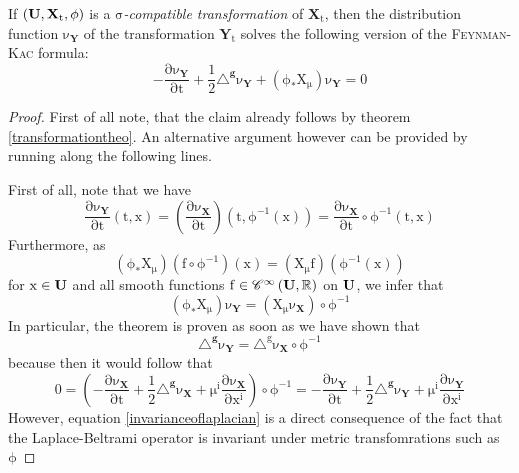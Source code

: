 \documentclass[10 pt,english]{smfart}
\newcommand{\Xt}{\mathrm{\mathbf{X}}_{t}}
\newcommand{\X}{\mathrm{\mathbf{X}}}
\newcommand{\Yt}{\mathrm{\mathbf{Y}}_{t}}
\newcommand{\Y}{\mathrm{\mathbf{Y}}}
\newcommand{\g}{\mathrm{\mathbf{g}}}
\newcommand{\U}{{\bf{U}}}
\begin{document}
\begin{theo}\label{transformdensities} If $\mathrm{(\U,\Xt,\phi)}$ is a $\mathrm{\sigma}$\textit{-compatible transformation} of $\mathrm{\Xt}$, then the distribution function $\mathrm{\nu_{\Y}}$ of the transformation $\mathrm{\Yt}$ solves the following version of the {\scshape{Feynman-Kac}} formula:
\begin{equation}
\mathrm{-\frac{\partial \nu_{\Y}}{\partial t}+\frac{1}{2}\triangle^{\g}\nu_{\Y}+\left(\phi_{*}X_{\mu}\right)\nu_{\Y}=0}
\end{equation}
\end{theo}
\begin{proof} First of all note, that the claim already follows by theorem \ref{transformationtheo}. An alternative argument however can be provided by running along the following lines.

First of all, note that we have 
\begin{equation}
\mathrm{\frac{\partial \nu_{\Y}}{\partial t}(t,x)=\left(\frac{\partial \nu_{\X}}{\partial t}\right)\left(t, \phi^{-1}(x)\right)=\frac{\partial \nu_{\X}}{\partial t}\circ \phi^{-1}\left(t,x\right)}
\end{equation} 
Furthermore, as
\begin{equation}
\mathrm{\left(\phi_{*}X_{\mu}\right)\left(f\circ\phi^{-1}\right)(x)=\left(X_{\mu}f\right)\left(\phi^{-1}(x)\right)}
\end{equation} for $\mathrm{x\in\U}$ and all smooth functions $\mathrm{f\in\mathscr{C}^{\infty}\left(\U,\mathbb{R}\right)}$ on $\mathrm{\U}$, we infer that 
\begin{equation}
\mathrm{\left(\phi_{*}X_{\mu}\right)\nu_{\Y}=\left(X_{\mu}\nu_{\X}\right)\circ\phi^{-1}}
\end{equation} In particular, the theorem is proven as soon as we have shown that 
\begin{equation}\label{invarianceoflaplacian}
\mathrm{\triangle^{\g}\nu_{\Y}=\triangle^{g}\nu_{\X}\circ \phi^{-1}}
\end{equation} because then it would follow that
\begin{equation}
\mathrm{0=\left(-\frac{\partial \nu_{\X}}{\partial t}+\frac{1}{2}\triangle^{\g}\nu_{\X}+\mu^{i}\frac{\partial \nu_{\X}}{\partial x^{i}}\right)\circ\phi^{-1}=-\frac{\partial \nu_{\Y}}{\partial t}+\frac{1}{2}\triangle^{\g}\nu_{\Y}+\mu^{i}\frac{\partial \nu_{\Y}}{\partial x^{i}}}
\end{equation} However, equation \ref{invarianceoflaplacian} is a direct consequence of the fact that the Laplace-Beltrami operator is invariant under metric transfomrations such as $\mathrm{\phi}$
\end{proof}
\end{document}
